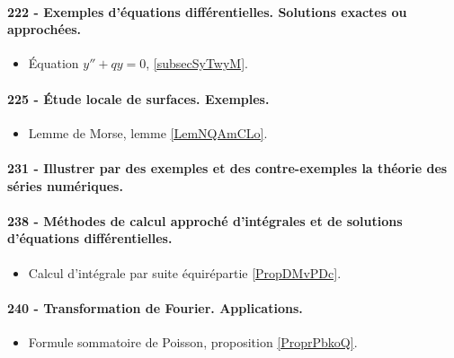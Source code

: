 \paragraph{222 - Exemples d’équations différentielles. Solutions exactes ou approchées.}
\begin{itemize}
    \item Équation \( y''+qy=0\), \ref{subsecSyTwyM}.
\end{itemize}
\paragraph{225 - Étude locale de surfaces. Exemples.}
\begin{itemize}
    \item Lemme de Morse, lemme \ref{LemNQAmCLo}.
\end{itemize}
\paragraph{231 - Illustrer par des exemples et des contre-exemples la théorie des séries numériques.}
\paragraph{238 - Méthodes de calcul approché d’intégrales et de solutions d’équations différentielles.}
\begin{itemize}
    \item Calcul d'intégrale par suite équirépartie \ref{PropDMvPDc}.
\end{itemize}
\paragraph{240 - Transformation de Fourier. Applications.}
\begin{itemize}
    \item Formule sommatoire de Poisson, proposition \ref{ProprPbkoQ}.
\end{itemize}
